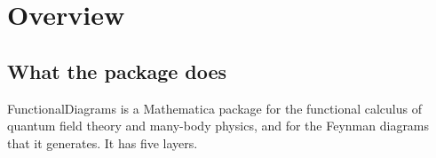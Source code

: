 \documentclass[11pt,a4paper]{article}
\begin{document}
\medskip
{\small\setlength{\parskip}{1pt}\tableofcontents}

\clearpage
\section{Overview}\label{sec:overview}

\subsection{What the package does}

FunctionalDiagrams is a Mathematica package for the functional calculus of quantum field theory and many-body physics,
and for the Feynman diagrams that it generates. It has five layers.
\end{document}
